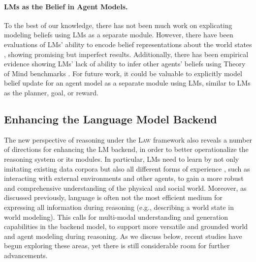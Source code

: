 \documentclass{article}
\def\modelname{\textsc{Law}\xspace}
\newcommand{\hzt}[1]{{\color{red}{[ZT: #1]}}}
\begin{document}
\paragraph{LMs as the Belief in Agent Models.} To the best of our knowledge, there has not been much work on explicating modeling beliefs using LMs as a separate module. However, there have been evaluations of LMs' ability to encode belief representations about the world states \citep[e.g.,][]{li2021implicit}, showing promising but imperfect results. Additionally, there has been empirical evidence showing LMs' lack of ability to infer other agents' beliefs using Theory of Mind benchmarks \citep{sap2022neural,jin2023mmtom,ullman2023large,shapira2023clever}. For future work, it could be valuable to explicitly model belief update for an agent model as a separate module using LMs, similar to LMs as the planner, goal, or reward.








\subsection{Enhancing the Language Model Backend}\label{sec:law:learning}

The new perspective of reasoning under the \modelname framework also reveals a number of directions for enhancing the LM backend, in order to better operationalize the reasoning system or its modules. In particular, LMs need to learn by not only imitating existing data corpora but also all different forms of experience \citep{Hu2022Toward}, such as interacting with external environments and other agents, to gain a more robust and comprehensive understanding of the physical and social world. Moreover, as discussed previously, language is often not the most efficient medium for expressing all information during reasoning (e.g., describing a world state in world modeling). This calls for multi-modal understanding and generation capabilities in the backend model, to support more versatile and grounded world and agent modeling during reasoning. As we discuss below, recent studies have begun exploring these areas, yet there is still considerable room for further advancements.
\end{document}
